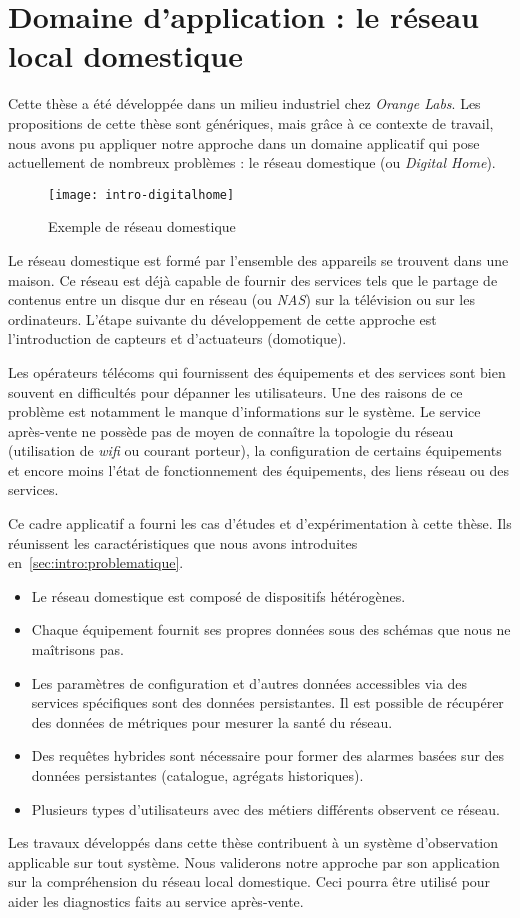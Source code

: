 \section{Domaine d'application : le réseau local domestique}\label{sec:introduction:digitalhome}
Cette thèse a été développée dans un milieu industriel chez \textit{Orange Labs}. Les propositions de cette thèse sont génériques, mais grâce à ce contexte de travail, nous avons pu appliquer notre approche dans un domaine applicatif qui pose actuellement de nombreux problèmes : le réseau domestique (ou \textit{Digital Home}).

\begin{figure}[ht]
\centering
\texttt{[image: intro-digitalhome]}
\caption{Exemple de réseau domestique}
\end{figure}

Le réseau domestique est formé par l'ensemble des appareils se trouvent dans une maison. Ce réseau est déjà capable de fournir des services tels que le partage de contenus entre un disque dur en réseau (ou \textit{NAS}) sur la télévision ou sur les ordinateurs. L'étape suivante du développement de cette approche est l'introduction de capteurs et d'actuateurs (domotique).

Les opérateurs télécoms qui fournissent des équipements et des services sont bien souvent en difficultés pour dépanner les utilisateurs. Une des raisons de ce problème est notamment le manque d'informations sur le système. Le service après-vente ne possède pas de moyen de connaître la topologie du réseau (utilisation de \textit{wifi} ou courant porteur), la configuration de certains équipements et encore moins l'état de fonctionnement des équipements, des liens réseau ou des services.

Ce cadre applicatif a fourni les cas d'études et d'expérimentation à cette thèse. Ils réunissent les caractéristiques que nous avons introduites en~\ref{sec:intro:problematique}.
\begin{itemize}
	\item Le réseau domestique est composé de dispositifs hétérogènes.
	\item Chaque équipement fournit ses propres données sous des schémas que nous ne maîtrisons pas.
	\item Les paramètres de configuration et d'autres données accessibles via des services spécifiques sont des données persistantes. Il est possible de récupérer des données de métriques pour mesurer la santé du réseau.
	\item Des requêtes hybrides sont nécessaire pour former des alarmes basées sur des données persistantes (catalogue, agrégats historiques).
	\item Plusieurs types d'utilisateurs avec des métiers différents observent ce réseau.
\end{itemize}

Les travaux développés dans cette thèse contribuent à un système d'observation applicable sur tout système. Nous validerons notre approche par son application sur la compréhension du réseau local domestique. Ceci pourra être utilisé pour aider les diagnostics faits au service après-vente.
